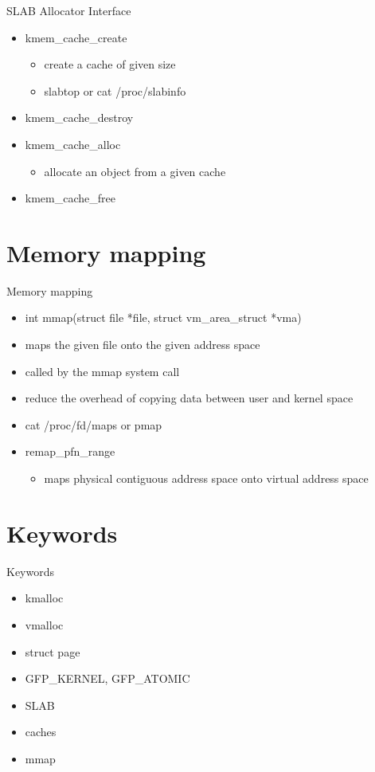 \documentclass{workshop}
\begin{document}
\begin{frame}{SLAB Allocator Interface}
  \begin{itemize}
  \item kmem_cache_create
  \begin{itemize}
  \item create a cache of given size
  \item slabtop or cat /proc/slabinfo
   \end{itemize}
   \item kmem_cache_destroy
   \item kmem_cache_alloc
   \begin{itemize}
    \item allocate an object from a given cache
   \end{itemize}
   \item kmem_cache_free
  \end{itemize}
\end{frame}

\section{Memory mapping}
\begin{frame}{Memory mapping}
  \begin{itemize}
    \item int mmap(struct file *file, struct vm_area_struct *vma)
    \item maps the given file onto the given address space
    \item called by the mmap system call
    \item reduce the overhead of copying data between user and kernel space
    \item cat /proc/fd/maps or pmap
    \item remap_pfn_range
    \begin{itemize}
    \item maps physical contiguous address space onto virtual address space
    \end{itemize}
  \end{itemize}
\end{frame}




\section{Keywords}

\begin{frame}{Keywords}
      \begin{itemize}
        \item kmalloc
        \item vmalloc
        \item struct page
        \item GFP_KERNEL, GFP_ATOMIC
        \item SLAB
        \item caches
        \item mmap
      \end{itemize}
\end{frame}
\end{document}
